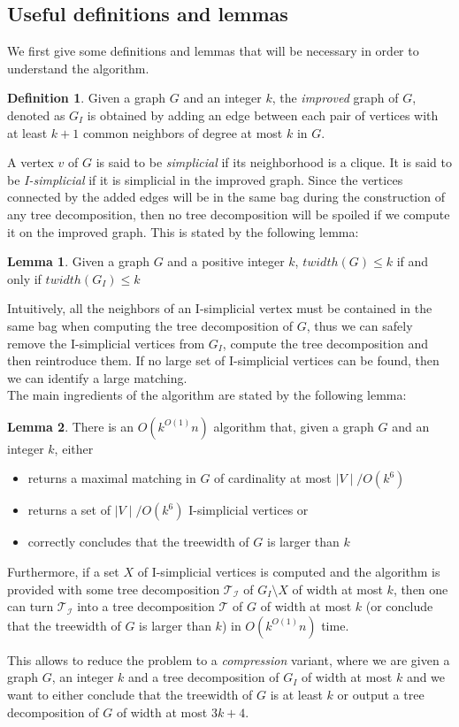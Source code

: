 \documentclass{article}
\theoremstyle{definition}
\newtheorem{definition}{Definition}[section]
\theoremstyle{lemma}
\newtheorem{lemma}{Lemma}[section]
\theoremstyle{corollary}
\theoremstyle{theorem}
\begin{document}
\subsection{Useful definitions and lemmas}
We first give some definitions and lemmas that will be necessary in order to understand the algorithm.
\theoremstyle{definition}
\begin{definition}
	Given a graph $G$ and an integer $k$, the \emph{improved} graph of $G$, denoted as $G_I$ is
	obtained by adding an edge between each pair of vertices with at least $k+1$ common
	neighbors of degree at most $k$ in $G$.
\end{definition}
A vertex $v$ of $G$ is said to be \emph{simplicial} if its neighborhood is a clique. It is said to be \emph{I-simplicial} if it is simplicial in the improved graph. Since the vertices connected by the added edges will be in the same bag during the construction of any tree decomposition, then no tree decomposition will be spoiled if we compute it on the improved graph. This is stated by the following lemma:
\begin{lemma}
	Given a graph $G$ and a positive integer $k$, $twidth(G) \leq k$ if and only if 
	$twidth(G_I) \leq k$ 
\end{lemma}
Intuitively, all the neighbors of an I-simplicial vertex must be contained in the same bag when computing the tree decomposition of $G$, thus we can safely remove the I-simplicial vertices from $G_I$, compute the tree decomposition and then reintroduce them. If no large set of I-simplicial vertices can be found, then we can identify a large matching. \\
The main ingredients of the algorithm are stated by the following lemma:
\begin{lemma}\label{lem}
	There is an $O(k^{O(1)}n)$ algorithm that, given a graph $G$ and an integer $k$, either
	\begin{itemize}
		\item returns a maximal matching in $G$ of cardinality at most $\mid V \mid /O(k^6)$
		\item returns a set of $\mid V \mid /O(k^6)$ I-simplicial vertices or
		\item correctly concludes that the treewidth of $G$ is larger than $k$
	\end{itemize}
	Furthermore, if a set $X$ of I-simplicial vertices is computed and the algorithm is provided
	with some tree decomposition $\mathcal{T_I}$ of $G_I \setminus X$ of width at most $k$, 
	then one can turn $\mathcal{T_I}$ into a tree decomposition $\mathcal{T}$ of $G$ of width at
	most $k$ (or conclude that the treewidth of $G$ is larger than $k$) in $O(k^{O(1)}n)$ time.
\end{lemma}
This allows to reduce the problem to a \emph{compression} variant, where we are given a graph
$G$, an integer $k$ and a tree decomposition of $G_I$ of width at most $k$ and we want to either conclude that the treewidth of $G$ is at least $k$ or output a tree decomposition of $G$ of width at most $3k+4$.
\end{document}
